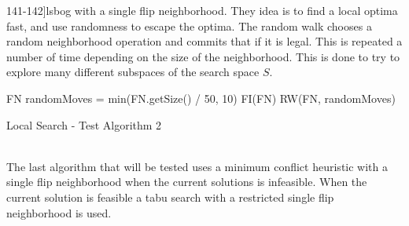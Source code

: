 141-142]{lsbog} with a single flip neighborhood. They idea is to find a local optima fast, and use randomness to escape 
the optima. The random walk chooses a random neighborhood operation and commits that if it is legal. This is repeated 
a number of time depending on the size of the neighborhood. This is done to try to explore many different subspaces 
of the search space $S$. \\ 
\IncMargin{1em}
\begin{algorithm}[H]

  \algdata

 FN \;
\int randomMoves = min(FN.getSize() / 50, 10) \;
 FI(FN) \;
 RW(FN, randomMoves) \;
\caption{Local Search - Test Algorithm 2} \label{algo_LS2} 
\end{algorithm} \noindent
\DecMargin{1em} \\
The last algorithm that will be tested uses a minimum conflict heuristic with a single flip neighborhood when the 
current solutions is infeasible. When the current solution is feasible a tabu search with a restricted single flip 
neighborhood is used. \\ 

